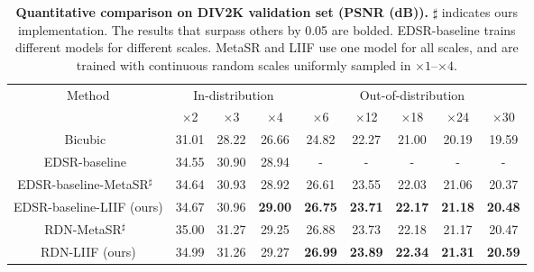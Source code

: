 \documentclass[final]{cvpr}
\begin{document}
\begin{table*}[]
    \centering
    \begin{tabular}{c|ccc|ccccc}
        \multirow{2}{*}{Method} & \multicolumn{3}{c|}{In-distribution} & \multicolumn{5}{c}{Out-of-distribution} \\
        & $\times$2 & $\times$3 & $\times$4 & $\times$6 & $\times$12 & $\times$18 & $\times$24 & $\times$30 \\
        \hline
        Bicubic~\cite{lim2017enhanced} & 31.01 & 28.22 & 26.66 & 24.82 & 22.27 & 21.00 & 20.19 & 19.59 \\
        EDSR-baseline~\cite{lim2017enhanced} & 34.55 & 30.90 & 28.94 & - & - & - & - & - \\
        EDSR-baseline-MetaSR$^\sharp$~\cite{hu2019meta} & 34.64 & 30.93 & 28.92 & 26.61 & 23.55 & 22.03 & 21.06 & 20.37 \\
        EDSR-baseline-LIIF (ours) & 34.67 & 30.96 & \textbf{29.00} & \textbf{26.75} & \textbf{23.71} & \textbf{22.17} & \textbf{21.18} & \textbf{20.48} \\
        \hline
        RDN-MetaSR$^\sharp$~\cite{hu2019meta} & 35.00 & 31.27 & 29.25 & 26.88 & 23.73 & 22.18 & 21.17 & 20.47 \\
        RDN-LIIF (ours) & 34.99 & 31.26 & 29.27 & \textbf{26.99} & \textbf{23.89} & \textbf{22.34} & \textbf{21.31} & \textbf{20.59} \\
    \end{tabular}
    \caption{\textbf{Quantitative comparison on DIV2K validation set (PSNR (dB)).} $\sharp$ indicates ours implementation. The results that surpass others by 0.05 are bolded. EDSR-baseline trains different models for different scales. MetaSR and LIIF use one model for all scales, and are trained with continuous random scales uniformly sampled in $\times1$--$\times4$.}
    \label{tab:div2k}
\end{table*}
\end{document}
